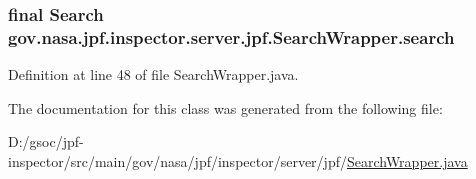 \subsubsection[{\texorpdfstring{search}{search}}]{\setlength{\rightskip}{0pt plus 5cm}final Search gov.\+nasa.\+jpf.\+inspector.\+server.\+jpf.\+Search\+Wrapper.\+search\hspace{0.3cm}{\ttfamily [private]}}\hypertarget{classgov_1_1nasa_1_1jpf_1_1inspector_1_1server_1_1jpf_1_1_search_wrapper_a5a0209e7de55d2271fd8a8caacc963e8}{}\label{classgov_1_1nasa_1_1jpf_1_1inspector_1_1server_1_1jpf_1_1_search_wrapper_a5a0209e7de55d2271fd8a8caacc963e8}


Definition at line 48 of file Search\+Wrapper.\+java.



The documentation for this class was generated from the following file\+:\begin{DoxyCompactItemize}
\item 
D\+:/gsoc/jpf-\/inspector/src/main/gov/nasa/jpf/inspector/server/jpf/\hyperlink{_search_wrapper_8java}{Search\+Wrapper.\+java}\end{DoxyCompactItemize}
